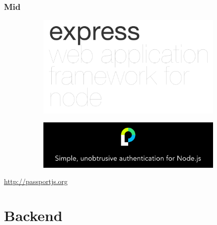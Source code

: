 \documentclass[10pt, compress]{beamer}
\begin{document}
\begin{frame}[fragile]

  \frametitle{Mid}

  \begin{figure}
    \centering
    \begin{subfigure}{.75\textwidth}
      \centering
      \includegraphics[width=0.9\linewidth]{images/express}
    \end{subfigure}
    
    \begin{subfigure}{.75\textwidth}
      \centering
      \includegraphics[width=0.9\linewidth]{images/passportjs}
    \end{subfigure}
  \end{figure}
  \begin{center}
    \url{http://passportjs.org}
  \end{center}

\end{frame}

\section{Backend}
\end{document}
